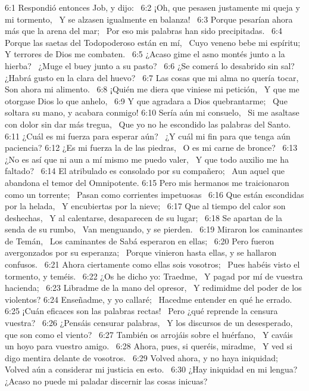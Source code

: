 6:1 Respondió entonces Job, y dijo:  
6:2 ¡Oh, que pesasen justamente mi queja y mi tormento,  
Y se alzasen igualmente en balanza!  
6:3 Porque pesarían ahora más que la arena del mar;  
Por eso mis palabras han sido precipitadas.  
6:4 Porque las saetas del Todopoderoso están en mí,  
Cuyo veneno bebe mi espíritu;  
Y terrores de Dios me combaten.  
6:5 ¿Acaso gime el asno montés junto a la hierba?  
¿Muge el buey junto a su pasto?  
6:6 ¿Se comerá lo desabrido sin sal?  
¿Habrá gusto en la clara del huevo?  
6:7 Las cosas que mi alma no quería tocar,  
Son ahora mi alimento.  
6:8 ¡Quién me diera que viniese mi petición,  
Y que me otorgase Dios lo que anhelo,  
6:9 Y que agradara a Dios quebrantarme;  
Que soltara su mano, y acabara conmigo! 
6:10 Sería aún mi consuelo,  
Si me asaltase con dolor sin dar más tregua,  
Que yo no he escondido las palabras del Santo.  
6:11 ¿Cuál es mi fuerza para esperar aún?  
¿Y cuál mi fin para que tenga aún paciencia? 
6:12 ¿Es mi fuerza la de las piedras,  
O es mi carne de bronce?  
6:13 ¿No es así que ni aun a mí mismo me puedo valer,  
Y que todo auxilio me ha faltado?  
6:14 El atribulado es consolado por su compañero;  
Aun aquel que abandona el temor del Omnipotente. 
6:15 Pero mis hermanos me traicionaron como un torrente;  
Pasan como corrientes impetuosas  
6:16 Que están escondidas por la helada,  
Y encubiertas por la nieve;  
6:17 Que al tiempo del calor son deshechas,  
Y al calentarse, desaparecen de su lugar;  
6:18 Se apartan de la senda de su rumbo,  
Van menguando, y se pierden.  
6:19 Miraron los caminantes de Temán,  
Los caminantes de Sabá esperaron en ellas;  
6:20 Pero fueron avergonzados por su esperanza;  
Porque vinieron hasta ellas, y se hallaron confusos.  
6:21 Ahora ciertamente como ellas sois vosotros;  
Pues habéis visto el tormento, y teméis.  
6:22 ¿Os he dicho yo: Traedme,  
Y pagad por mí de vuestra hacienda;  
6:23 Libradme de la mano del opresor,  
Y redimidme del poder de los violentos? 
6:24 Enseñadme, y yo callaré;  
Hacedme entender en qué he errado.  
6:25 ¡Cuán eficaces son las palabras rectas!  
Pero ¿qué reprende la censura vuestra?  
6:26 ¿Pensáis censurar palabras,  
Y los discursos de un desesperado, que son como el viento?  
6:27 También os arrojáis sobre el huérfano,  
Y caváis un hoyo para vuestro amigo.  
6:28 Ahora, pues, si queréis, miradme,  
Y ved si digo mentira delante de vosotros.  
6:29 Volved ahora, y no haya iniquidad;  
Volved aún a considerar mi justicia en esto.  
6:30 ¿Hay iniquidad en mi lengua?  
¿Acaso no puede mi paladar discernir las cosas inicuas?  
